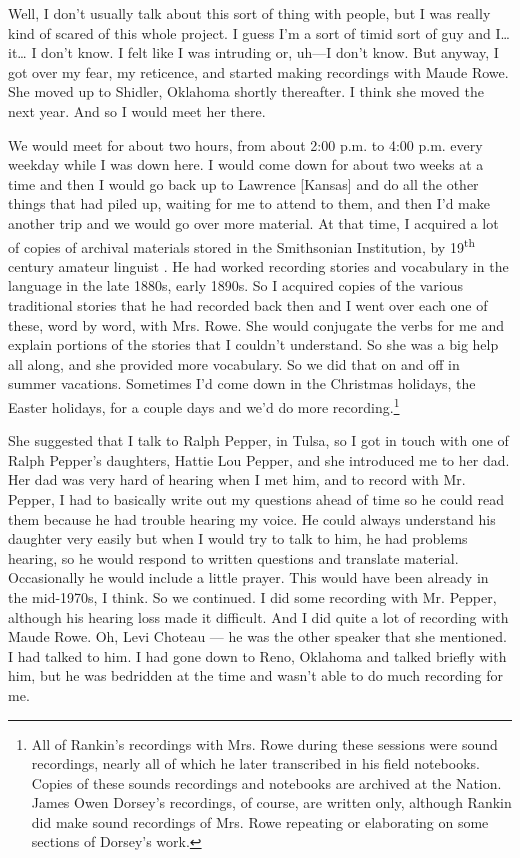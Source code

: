 \documentclass[output=paper]{LSP/langsci}
\begin{document}
Well, I don't usually talk about this sort of thing with people, but I was really kind of scared of this whole project. I guess I'm a sort of timid sort of guy and I{\ldots} it{\ldots} I don't know. I felt like I was intruding or, uh---I don't know. But anyway, I got over my fear, my reticence, and started making recordings with Maude Rowe. She moved up to Shidler, Oklahoma shortly thereafter. I think she moved the next year. And so I would meet her there. 

We would meet for about two hours, from about 2:00 p.m. to 4:00 p.m. every weekday while I was down here. I would come down for about two weeks at a time and then I would go back up to Lawrence [Kansas] and do all the other things that had piled up, waiting for me to attend to them, and then I'd make another trip and we would go over more material. At that time, I acquired a lot of copies of archival materials stored in the Smithsonian Institution, by 19\textsuperscript{th} century amateur linguist . He had worked recording stories and vocabulary in the  language in the late 1880s, early 1890s. So I acquired copies of the various  traditional stories that he had recorded back then and I went over each one of these, word by word, with Mrs. Rowe. She would conjugate the verbs for me and explain portions of the stories that I couldn't understand. So she was a big help all along, and she provided more vocabulary. So we did that on and off in summer vacations. Sometimes I'd come down in the Christmas holidays, the Easter holidays, for a couple days and we'd do more recording.\footnote{All of Rankin's recordings with Mrs. Rowe during these sessions were sound recordings, nearly all of which he later transcribed in his field notebooks. Copies of these sounds recordings and notebooks are archived at the  Nation. James Owen Dorsey's recordings, of course, are written only, although Rankin did make sound recordings of Mrs. Rowe repeating or elaborating on some sections of Dorsey's work.}

She suggested that I talk to Ralph Pepper, in Tulsa, so I got in touch with one of Ralph Pepper's daughters, Hattie Lou Pepper, and she introduced me to her dad. Her dad was very hard of hearing when I met him, and to record with Mr. Pepper, I had to basically write out my questions ahead of time so he could read them because he had trouble hearing my voice. He could always understand his daughter very easily but when I would try to talk to him, he had problems hearing, so he would respond to written questions and translate material. Occasionally he would include a little prayer. This would have been already in the mid-1970s, I think. So we continued. I did some recording with Mr. Pepper, although his hearing loss made it difficult. And I did quite a lot of recording with Maude Rowe. Oh, Levi Choteau --- he was the other speaker that she mentioned. I had talked to him. I had gone down to Reno, Oklahoma and talked briefly with him, but he was bedridden at the time and wasn't able to do much recording for me.
\end{document}
